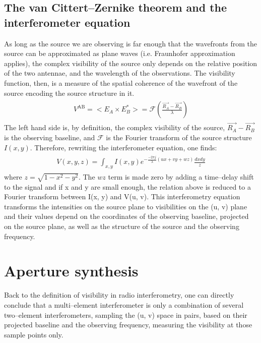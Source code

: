 \documentclass[a4wide,12pt]{book}
\begin{document}
\subsection*{The van Cittert--Zernike theorem and the interferometer equation}
As long as the source we are observing is far enough that the wavefronts from the source can be approximated as plane waves (i.e. Fraunhofer approximation applies), the complex visibility of the source only depends on the relative position of the two antennae, and the wavelength of the observations. The visibility function, then, is a measure of the spatial coherence of the wavefront of the source encoding the source structure in it.
\begin{align} 
\begin{split}
\label{eq:vC-Z}
V^\mathrm{AB} = <E_A \times E_B^*> = \mathcal{F}(\frac{\vec{R_A} - \vec{R_B}}{\lambda})
\end{split}                    
\end{align}
The left hand side is, by definition, the complex visibility of the source, $\vec{R_A} - \vec{R_B}$ is the observing baseline, and $\mathcal{F}$ is the Fourier transform of the source structure $I(x, y)$. Therefore, rewriting the interferometer equation, one finds:
\begin{align} 
\begin{split}
\label{eq:InterferometerEq}
V(x,y,z) = \int_{x,y} I(x, y) e^{-\frac{-2\pi j}{\lambda}(ux+vy+wz)} \frac{dx dy}{z}
\end{split}                    
\end{align}
where $z=\sqrt{1-x^2-y^2}$. The $wz$ term is made zero by adding a time--delay shift to the signal and if x and y are small enough, the relation above is reduced to a Fourier transform between I(x, y) and V(u, v). This interferometry equation transforms the intensities on the source plane to visibilities on the (u, v) plane and their values depend on the coordinates of the observing baseline, projected on the source plane, as well as the structure of the source and the observing frequency. 

\section{Aperture synthesis}
Back to the definition of visibility in radio interferometry, one can directly conclude that a multi--element interferometer is only a combination of several two--element interferometers, sampling the (u, v) space in pairs, based on their projected baseline and the observing frequency, measuring the visibility at those sample points only. 
\end{document}
